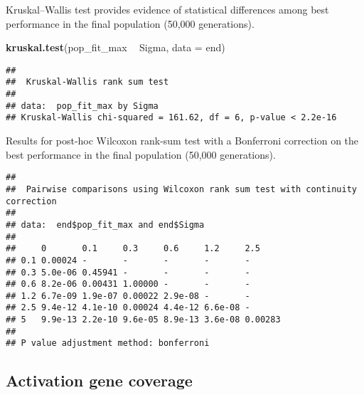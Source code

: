 \documentclass[]{book}
\newenvironment{Shaded}{\begin{snugshade}}{\end{snugshade}}
\newcommand{\DataTypeTok}[1]{\textcolor[rgb]{0.13,0.29,0.53}{#1}}
\newcommand{\KeywordTok}[1]{\textcolor[rgb]{0.13,0.29,0.53}{\textbf{#1}}}
\newcommand{\NormalTok}[1]{#1}
\newcommand{\OperatorTok}[1]{\textcolor[rgb]{0.81,0.36,0.00}{\textbf{#1}}}
\newcommand{\OtherTok}[1]{\textcolor[rgb]{0.56,0.35,0.01}{#1}}
\newcommand{\StringTok}[1]{\textcolor[rgb]{0.31,0.60,0.02}{#1}}
\begin{document}
Kruskal--Wallis test provides evidence of statistical differences among best performance in the final population (50,000 generations).

\begin{Shaded}
\begin{Highlighting}[]
\KeywordTok{kruskal.test}\NormalTok{(pop_fit_max }\OperatorTok{~}\StringTok{ }\NormalTok{Sigma, }\DataTypeTok{data =}\NormalTok{ end)}
\end{Highlighting}
\end{Shaded}

\begin{verbatim}
## 
##  Kruskal-Wallis rank sum test
## 
## data:  pop_fit_max by Sigma
## Kruskal-Wallis chi-squared = 161.62, df = 6, p-value < 2.2e-16
\end{verbatim}

Results for post-hoc Wilcoxon rank-sum test with a Bonferroni correction on the best performance in the final population (50,000 generations).

\begin{Shaded}
\end{Shaded}

\begin{verbatim}
## 
##  Pairwise comparisons using Wilcoxon rank sum test with continuity correction 
## 
## data:  end$pop_fit_max and end$Sigma 
## 
##     0       0.1     0.3     0.6     1.2     2.5    
## 0.1 0.00024 -       -       -       -       -      
## 0.3 5.0e-06 0.45941 -       -       -       -      
## 0.6 8.2e-06 0.00431 1.00000 -       -       -      
## 1.2 6.7e-09 1.9e-07 0.00022 2.9e-08 -       -      
## 2.5 9.4e-12 4.1e-10 0.00024 4.4e-12 6.6e-08 -      
## 5   9.9e-13 2.2e-10 9.6e-05 8.9e-13 3.6e-08 0.00283
## 
## P value adjustment method: bonferroni
\end{verbatim}

\hypertarget{activation-gene-coverage-7}{%
\subsection{Activation gene coverage}\label{activation-gene-coverage-7}}
\end{document}
